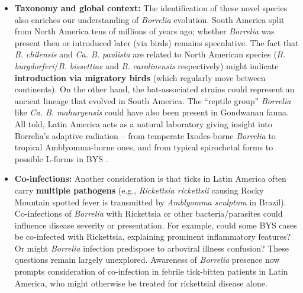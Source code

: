 \documentclass[11pt,letterpaper]{article}
\begin{document}
\begin{itemize}
    \item \textbf{Taxonomy and global context:} The identification of these novel species also enriches our understanding of \textit{Borrelia} evolution. South America split from North America tens of millions of years ago; whether \textit{Borrelia} was present then or introduced later (via birds) remains speculative. The fact that \textit{B. chilensis} and \textit{Ca. B. paulista} are related to North American species (\textit{B. burgdorferi}/\textit{B. bissettiae} and \textit{B. carolinensis} respectively) might indicate \textbf{introduction via migratory birds} (which regularly move between continents). On the other hand, the bat-associated strains could represent an ancient lineage that evolved in South America. The “reptile group” \textit{Borrelia} like \textit{Ca. B. mahuryensis} could have also been present in Gondwanan fauna. All told, Latin America acts as a natural laboratory giving insight into Borrelia’s adaptive radiation – from temperate Ixodes-borne \textit{Borrelia} to tropical Amblyomma-borne ones, and from typical spirochetal forms to possible L-forms in BYS \citep{Yoshinari2022ai, Yoshinari2022aj}.

    \item \textbf{Co-infections:} Another consideration is that ticks in Latin America often carry \textbf{multiple pathogens} (e.g., \textit{Rickettsia rickettsii} causing Rocky Mountain spotted fever is transmitted by \textit{Amblyomma sculptum} in Brazil). Co-infections of \textit{Borrelia} with Rickettsia or other bacteria/parasites could influence disease severity or presentation. For example, could some BYS cases be co-infected with Rickettsia, explaining prominent inflammatory features? Or might \textit{Borrelia} infection predispose to arboviral illness confusion? These questions remain largely unexplored. Awareness of \textit{Borrelia} presence now prompts consideration of co-infection in febrile tick-bitten patients in Latin America, who might otherwise be treated for rickettsial disease alone.
\end{itemize}
\end{document}
